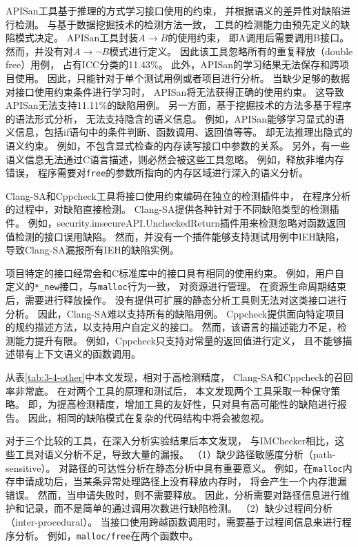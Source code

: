 APISan工具基于推理的方式学习接口使用的约束，
并根据语义的差异性对缺陷进行检测。
与基于数据挖掘技术的检测方法一致，
工具的检测能力由预先定义的缺陷模式决定。
APISan工具封装$A \rightarrow B$的使用约束，
即A调用后需要调用B接口。
然而，并没有对$A \rightarrow \neg B$模式进行定义。
因此该工具忽略所有的重复释放（double free）用例，
占有ICC分类的11.43\%。
此外，APISan的学习结果无法保存和跨项目使用。
因此，只能针对于单个测试用例或者项目进行分析。
当缺少足够的数据对接口使用约束条件进行学习时，
APISan将无法获得正确的使用约束。
这导致APISan无法支持11.11\%的缺陷用例。
另一方面，基于挖掘技术的方法多基于程序的语法形式分析，
无法支持隐含的语义信息。
例如，APISan能够学习显式的语义信息，包括if语句中的条件判断、函数调用、返回值等等。
却无法推理出隐式的语义约束。
例如，不包含显式检查的内存读写接口中参数的关系。
另外，有一些语义信息无法通过C语言描述，则必然会被这些工具忽略。
例如，释放非堆内存错误，
程序需要对\texttt{free}的参数所指向的内存区域进行深入的语义分析。

Clang-SA和Cppcheck工具将接口使用约束编码在独立的检测插件中，
在程序分析的过程中，对缺陷直接检测。
Clang-SA提供各种针对于不同缺陷类型的检测插件。
例如，security.insecureAPI.UncheckedReturn插件用来检测忽略对函数返回值检测的接口误用缺陷。
然而，并没有一个插件能够支持测试用例中IEH缺陷，
导致Clang-SA漏报所有IEH的缺陷实例。

项目特定的接口经常会和C标准库中的接口具有相同的使用约束。
例如，用户自定义的\texttt{*\_new}接口，与\texttt{malloc}行为一致，
对资源进行管理。
在资源生命周期结束后，需要进行释放操作。
没有提供可扩展的静态分析工具则无法对这类接口进行分析。
因此，Clang-SA难以支持所有的缺陷用例。
Cppcheck提供面向特定项目的规约描述方法，以支持用户自定义的接口。
然而，该语言的描述能力不足，检测能力提升有限。
例如，Cppcheck只支持对常量的返回值进行定义，
且不能够描述带有上下文语义的函数调用。

从表\ref{tab:3-4-other}中本文发现，相对于高检测精度，
Clang-SA和Cppcheck的召回率非常底。
在对两个工具的原理和测试后，
本文发现两个工具采取一种保守策略。
即，为提高检测精度，增加工具的友好性，只对具有高可能性的缺陷进行报告。
因此，相同的缺陷模式在复杂的代码结构中将会被忽视。

对于三个比较的工具，在深入分析实验结果后本文发现，
与IMChecker相比，这些工具对语义分析不足，导致大量的漏报。
（1）缺少路径敏感度分析（path-sensitive）。
对路径的可达性分析在静态分析中具有重要意义。
例如，在\texttt{malloc}内存申请成功后，当某条异常处理路径上没有释放内存时，
将会产生一个内存泄漏错误。
然而，当申请失败时，则不需要释放。
因此，分析需要对路径信息进行维护和记录，而不是简单的通过调用次数进行缺陷检测。
（2）缺少过程间分析（inter-procedural）。
当接口使用跨越函数调用时，需要基于过程间信息来进行程序分析。
例如，\texttt{malloc/free}在两个函数中。


